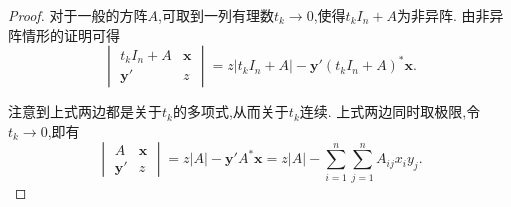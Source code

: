 \documentclass[lang=cn,newtx,10pt,scheme=chinese]{elegantbook}
\begin{document}
\begin{proof}
对于一般的方阵\(A\),可取到一列有理数\(t_k\rightarrow0\),使得\(t_kI_n + A\)为非异阵. 由非异阵情形的证明可得
\[
\begin{vmatrix}
t_kI_n + A & \boldsymbol{x}\\
\boldsymbol{y}' & z
\end{vmatrix}=z|t_kI_n + A| - \boldsymbol{y}'(t_kI_n + A)^*\boldsymbol{x}.
\]

注意到上式两边都是关于\(t_k\)的多项式,从而关于\(t_k\)连续. 上式两边同时取极限,令\(t_k\rightarrow0\),即有
\[
\begin{vmatrix}
A & \boldsymbol{x}\\
\boldsymbol{y}' & z
\end{vmatrix}=z|A| - \boldsymbol{y}'A^*\boldsymbol{x}=z|A|-\sum_{i = 1}^{n}\sum_{j = 1}^{n}A_{ij}x_iy_j.
\]
\end{proof}
\end{document}
